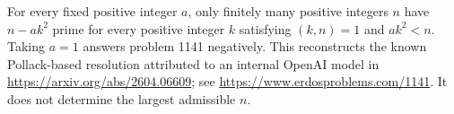 For every fixed positive integer \(a\), only finitely many positive integers \(n\) have \(n-ak^2\) prime for every positive integer \(k\) satisfying \((k,n)=1\) and \(ak^2<n\). Taking \(a=1\) answers problem 1141 negatively.
This reconstructs the known Pollack-based resolution attributed to an internal OpenAI model in \url{https://arxiv.org/abs/2604.06609}; see \url{https://www.erdosproblems.com/1141}. It does not determine the largest admissible \(n\).
